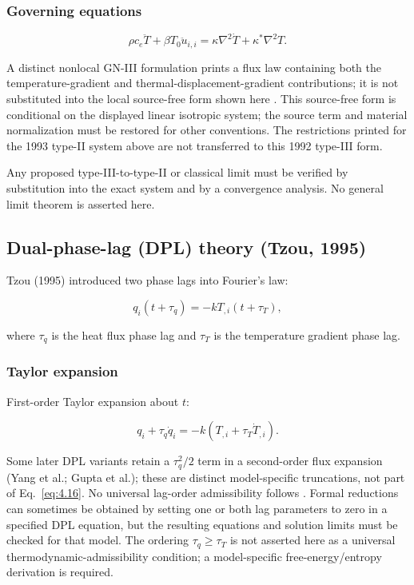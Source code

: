 \subsubsection{Governing equations}

\begin{equation}
\rho c_e\ddot{T} + \beta T_0\ddot{u}_{i,i} = \kappa\nabla^2\dot{T} + \kappa^*\nabla^2 T.
\label{eq:4.14}
\end{equation}

A distinct nonlocal GN-III formulation prints a flux law containing both the temperature-gradient and thermal-displacement-gradient contributions; it is not substituted into the local source-free form shown here \cite{Biswas2020a}. This source-free form is conditional on the displayed linear isotropic system; the source term and material normalization must be restored for other conventions. The restrictions printed for the 1993 type-II system above are not transferred to this 1992 type-III form.

Any proposed type-III-to-type-II or classical limit must be verified by substitution into the exact system and by a convergence analysis. No general limit theorem is asserted here.

\subsection{Dual-phase-lag (DPL) theory (Tzou, 1995)}
\label{sec:4.7}

Tzou (1995) introduced two phase lags into Fourier's law:

\begin{equation}
q_i(t + \tau_q) = -k T_{,i}(t + \tau_T),
\label{eq:4.15}
\end{equation}

where $\tau_q$ is the heat flux phase lag and $\tau_T$ is the temperature gradient phase lag.

\subsubsection{Taylor expansion}

First-order Taylor expansion about $t$:

\begin{equation}
q_i + \tau_q\dot{q}_i = -k(T_{,i} + \tau_T\dot{T}_{,i}).
\label{eq:4.16}
\end{equation}

Some later DPL variants retain a $\tau_q^2/2$ term in a second-order flux expansion (Yang et al.; Gupta et al.); these are distinct model-specific truncations, not part of Eq.~\eqref{eq:4.16}. No universal lag-order admissibility follows \cite{Yang2021,Gupta2023}. Formal reductions can sometimes be obtained by setting one or both lag parameters to zero in a specified DPL equation, but the resulting equations and solution limits must be checked for that model. The ordering $\tau_q\geq\tau_T$ is not asserted here as a universal thermodynamic-admissibility condition; a model-specific free-energy/entropy derivation is required.

